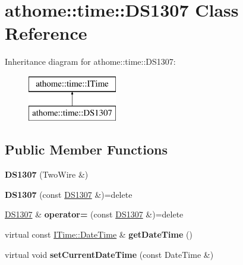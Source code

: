 \hypertarget{classathome_1_1time_1_1_d_s1307}{}\section{athome\+:\+:time\+:\+:D\+S1307 Class Reference}
\label{classathome_1_1time_1_1_d_s1307}
Inheritance diagram for athome\+:\+:time\+:\+:D\+S1307\+:\begin{figure}[H]
\begin{center}
\leavevmode
\includegraphics[height=2.000000cm]{classathome_1_1time_1_1_d_s1307}
\end{center}
\end{figure}
\subsection*{Public Member Functions}
\begin{DoxyCompactItemize}
\item 
\mbox{\label{classathome_1_1time_1_1_d_s1307_ac9894245cf5bef539272e6ed6c5ed237}} 
{\bfseries D\+S1307} (Two\+Wire \&)
\item 
\mbox{\label{classathome_1_1time_1_1_d_s1307_a28a802496d0d76cac3232720c0a1243e}} 
{\bfseries D\+S1307} (const \mbox{\hyperlink{classathome_1_1time_1_1_d_s1307}{D\+S1307}} \&)=delete
\item 
\mbox{\label{classathome_1_1time_1_1_d_s1307_a6aabfb829a3ac526526348d22180e09c}} 
\mbox{\hyperlink{classathome_1_1time_1_1_d_s1307}{D\+S1307}} \& {\bfseries operator=} (const \mbox{\hyperlink{classathome_1_1time_1_1_d_s1307}{D\+S1307}} \&)=delete
\item 
\mbox{\label{classathome_1_1time_1_1_d_s1307_a0d9a5f44484ec9676daa0180e01ebdf8}} 
virtual const \mbox{\hyperlink{structathome_1_1time_1_1_i_time_1_1_date_time}{I\+Time\+::\+Date\+Time}} \& {\bfseries get\+Date\+Time} ()
\item 
\mbox{\label{classathome_1_1time_1_1_d_s1307_a595285f3bf325d2208c6d48b686c5b86}} 
virtual void {\bfseries set\+Current\+Date\+Time} (const Date\+Time \&)
\end{DoxyCompactItemize}

